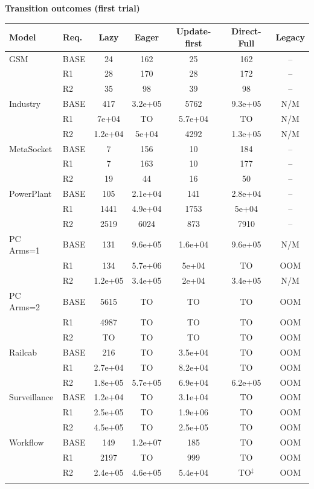 \clearpage\noindent\textbf{Transition outcomes (first trial)}\par\smallskip
\begingroup\scriptsize\setlength{\tabcolsep}{3pt}
\begin{tabular}{@{}llccccc@{}}
\toprule
Model & Req. & Lazy & Eager & Update-first & Direct-Full & Legacy\\
\midrule
GSM & BASE & 24 & 162 & 25 & 162 & --\\
 & R1 & 28 & 170 & 28 & 172 & --\\
 & R2 & 35 & 98 & 39 & 98 & --\\
\addlinespace[2pt]
Industry & BASE & 417 & 3.2e+05 & 5762 & 9.3e+05 & N/M\\
 & R1 & 7e+04 & TO & 5.7e+04 & TO & N/M\\
 & R2 & 1.2e+04 & 5e+04 & 4292 & 1.3e+05 & N/M\\
\addlinespace[2pt]
MetaSocket & BASE & 7 & 156 & 10 & 184 & --\\
 & R1 & 7 & 163 & 10 & 177 & --\\
 & R2 & 19 & 44 & 16 & 50 & --\\
\addlinespace[2pt]
PowerPlant & BASE & 105 & 2.1e+04 & 141 & 2.8e+04 & --\\
 & R1 & 1441 & 4.9e+04 & 1753 & 5e+04 & --\\
 & R2 & 2519 & 6024 & 873 & 7910 & --\\
\addlinespace[2pt]
PC Arms=1 & BASE & 131 & 9.6e+05 & 1.6e+04 & 9.6e+05 & N/M\\
 & R1 & 134 & 5.7e+06 & 5e+04 & TO & OOM\\
 & R2 & 1.2e+05 & 3.4e+05 & 2e+04 & 3.4e+05 & N/M\\
\addlinespace[2pt]
PC Arms=2 & BASE & 5615 & TO & TO & TO & OOM\\
 & R1 & 4987 & TO & TO & TO & OOM\\
 & R2 & TO & TO & TO & TO & OOM\\
\addlinespace[2pt]
Railcab & BASE & 216 & TO & 3.5e+04 & TO & OOM\\
 & R1 & 2.7e+04 & TO & 8.2e+04 & TO & OOM\\
 & R2 & 1.8e+05 & 5.7e+05 & 6.9e+04 & 6.2e+05 & OOM\\
\addlinespace[2pt]
Surveillance & BASE & 1.2e+04 & TO & 3.1e+04 & TO & OOM\\
 & R1 & 2.5e+05 & TO & 1.9e+06 & TO & OOM\\
 & R2 & 4.5e+05 & TO & 2.5e+05 & TO & OOM\\
\addlinespace[2pt]
Workflow & BASE & 149 & 1.2e+07 & 185 & TO & OOM\\
 & R1 & 2197 & TO & 999 & TO & OOM\\
 & R2 & 2.4e+05 & 4.6e+05 & 5.4e+04 & TO$^{\ddagger}$ & OOM\\
\addlinespace[2pt]
\bottomrule
\end{tabular}\endgroup

